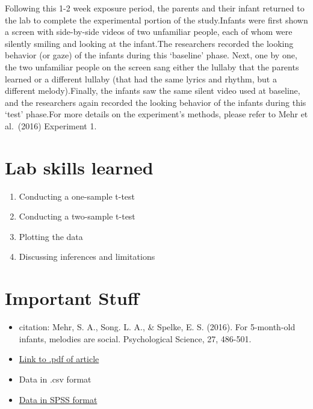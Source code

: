 \documentclass[
]{book}
\providecommand{\tightlist}{%
  \setlength{\itemsep}{0pt}\setlength{\parskip}{0pt}}
\begin{document}
Following this 1-2 week exposure period, the parents and their infant returned to the lab to complete the experimental portion of the study.Infants were first shown a screen with side-by-side videos of two unfamiliar people, each of whom were silently smiling and looking at the infant.The researchers recorded the looking behavior (or gaze) of the infants during this `baseline' phase. Next, one by one, the two unfamiliar people on the screen sang either the lullaby that the parents learned or a different lullaby (that had the same lyrics and rhythm, but a different melody).Finally, the infants saw the same silent video used at baseline, and the researchers again recorded the looking behavior of the infants during this `test' phase.For more details on the experiment's methods, please refer to Mehr et al.~(2016) Experiment 1.

\hypertarget{lab-skills-learned}{%
\section{Lab skills learned}\label{lab-skills-learned}}

\begin{enumerate}
\def\labelenumi{\arabic{enumi}.}
\tightlist
\item
  Conducting a one-sample t-test
\item
  Conducting a two-sample t-test
\item
  Plotting the data
\item
  Discussing inferences and limitations
\end{enumerate}

\hypertarget{important-stuff}{%
\section{Important Stuff}\label{important-stuff}}

\begin{itemize}
\tightlist
\item
  citation: Mehr, S. A., Song. L. A., \& Spelke, E. S. (2016). For 5-month-old infants, melodies are social. Psychological Science, 27, 486-501.
\item
  \href{http://journals.sagepub.com/stoken/default+domain/d5HcBHg85XamSXGdYqYN/full}{Link to .pdf of article}
\item
  Data in .csv format
\item
  \href{https://drive.google.com/open?id=0Bz-rhZ21ShvOa3c4X3hqOWxwcUU}{Data in SPSS format}
\end{itemize}
\end{document}
